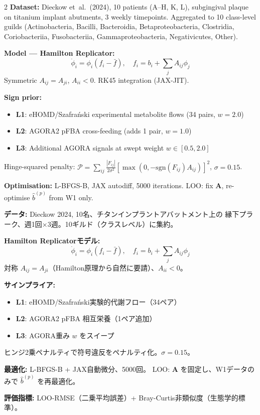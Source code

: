 \documentclass[10pt,a4paper]{article}
\newcommand{\bA}{\mathbf{A}}
\begin{document}
\begin{multicols}{2}
\small
\textbf{Dataset:} Dieckow et~al.~(2024), 10 patients (A--H, K, L),
subgingival plaque on titanium implant abutments, 3 weekly timepoints.
Aggregated to 10 class-level guilds (Actinobacteria, Bacilli, Bacteroidia,
Betaproteobacteria, Clostridia, Coriobacteriia, Fusobacteriia,
Gammaproteobacteria, Negativicutes, Other).

\textbf{Model — Hamilton Replicator:}
\[
  \dot\phi_i = \phi_i(f_i - \bar f),\quad f_i = b_i + \textstyle\sum_j A_{ij}\phi_j
\]
Symmetric $A_{ij}=A_{ji}$, $A_{ii}<0$. RK45 integration (JAX-JIT).

\textbf{Sign prior:}
\begin{itemize}[noitemsep,leftmargin=*]
  \item \textbf{L1}: eHOMD/Szafra\'{n}ski experimental metabolite flows (34 pairs, $w=2.0$)
  \item \textbf{L2}: AGORA2 pFBA cross-feeding (adds 1 pair, $w=1.0$)
  \item \textbf{L3}: Additional AGORA signals at swept weight $w\in[0.5,2.0]$
\end{itemize}
Hinge-squared penalty: $\mathcal{P} = \sum_{ij}\frac{|F_{ij}|}{2\sigma^2}[\max(0,-\text{sgn}(F_{ij})A_{ij})]^2$,
$\sigma=0.15$.

\textbf{Optimisation:} L-BFGS-B, JAX autodiff, 5000 iterations.
LOO: fix $\bA$, re-optimise $\hat b^{(p)}$ from W1 only.

\columnbreak

\textbf{データ:} Dieckow 2024, 10名、チタンインプラントアバットメント上の
縁下プラーク、週1回×3週。10ギルド（クラスレベル）に集約。

\textbf{Hamilton Replicatorモデル:}
\[
  \dot\phi_i = \phi_i(f_i - \bar f),\quad f_i = b_i + \textstyle\sum_j A_{ij}\phi_j
\]
対称 $A_{ij}=A_{ji}$（Hamilton原理から自然に要請）、$A_{ii}<0$。

\textbf{サインプライア:}
\begin{itemize}[noitemsep,leftmargin=*]
  \item \textbf{L1}: eHOMD/Szafra\'{n}ski実験的代謝フロー（34ペア）
  \item \textbf{L2}: AGORA2 pFBA 相互栄養（1ペア追加）
  \item \textbf{L3}: AGORA重み $w$ をスイープ
\end{itemize}
ヒンジ2乗ペナルティで符号違反をペナルティ化。$\sigma=0.15$。

\textbf{最適化:} L-BFGS-B + JAX自動微分、5000回。
LOO: $\bA$ を固定し、W1データのみで $\hat b^{(p)}$ を再最適化。

\textbf{評価指標:} LOO-RMSE（二乗平均誤差）+ Bray-Curtis非類似度（生態学的標準）。
\end{multicols}
\end{document}

